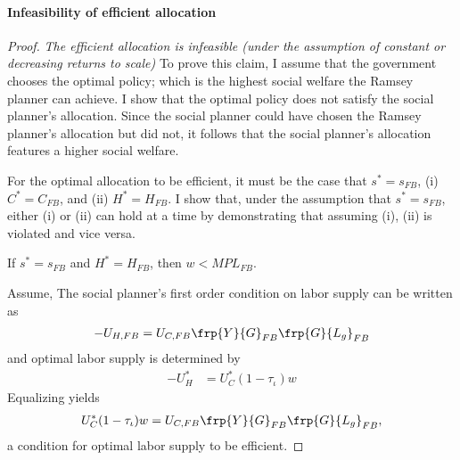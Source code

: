  \paragraph{Infeasibility of efficient allocation}
 \begin{proof}\textit{The efficient allocation is infeasible (under the assumption of constant or decreasing returns to scale)}
 	To prove this claim, I assume that the government chooses the optimal policy; which is the highest social welfare the Ramsey planner can achieve. I show that the optimal policy does not satisfy the social planner's allocation. Since the social planner could have chosen the Ramsey planner's allocation  but did not, it follows that the social planner's allocation features a higher social welfare.
 	
For the optimal allocation to be efficient, it must be the case that $s^*=s_{FB}$, (i) $C^*=C_{FB}$, and (ii) $H^*=H_{FB}$. I show that, under the assumption that $s^*=s_{FB}$, either (i) or (ii) can hold at a time by demonstrating that assuming (i), (ii) is violated and vice versa.


\begin{lemma}{If $s^*=s_{FB}$ and $H^*=H_{FB}$, then $w<MPL_{FB}$}.
\end{lemma}

%

Assume, 
The social planner's first order condition on labor supply can be written as
\begin{align}
-U_{H, FB}=U_{C, FB}\frp{Y}{G}_{FB}\frp{G}{L_g}_{FB}
\end{align}
and optimal labor supply is determined by
\begin{align}
-U^*_{H}&=U^*_C(1-\tau_\iota)w
\end{align}
Equalizing yields
\begin{align}
U_C^*(1-\tau_\iota)w=U_{C,FB}\frp{Y}{G}_{FB}\frp{G}{L_g}_{FB},
\end{align}
a condition for optimal labor supply to be efficient. 


\end{proof}
